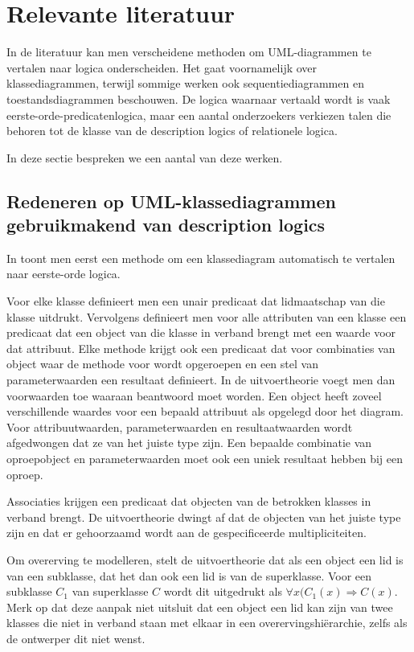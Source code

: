 \chapter{Relevante literatuur}\label{sec:literatuur}
In de literatuur kan men verscheidene methoden om UML-diagrammen te vertalen naar logica onderscheiden. Het gaat voornamelijk over klassediagrammen, terwijl sommige werken ook sequentiediagrammen en toestandsdiagrammen beschouwen. De logica waarnaar vertaald wordt is vaak eerste-orde-predicatenlogica, maar een aantal onderzoekers verkiezen talen die behoren tot de klasse van de description logics of relationele logica.

In deze sectie bespreken we een aantal van deze werken.

\section{Redeneren op UML-klassediagrammen gebruikmakend van description logics}
In \cite{BerardiDaniela2005RoUc} toont men eerst een methode om een klassediagram automatisch te vertalen naar eerste-orde logica.

Voor elke klasse definieert men een unair predicaat dat lidmaatschap van die klasse uitdrukt. Vervolgens definieert men voor alle attributen van een klasse een predicaat dat een object van die klasse in verband brengt met een waarde voor dat attribuut. Elke methode krijgt ook een predicaat dat voor combinaties van object waar de methode voor wordt opgeroepen en een stel van parameterwaarden een resultaat definieert. In de uitvoertheorie voegt men dan voorwaarden toe waaraan beantwoord moet worden. Een object heeft zoveel verschillende waardes voor een bepaald attribuut als opgelegd door het diagram. Voor attribuutwaarden, parameterwaarden en resultaatwaarden wordt afgedwongen dat ze van het juiste type zijn. Een bepaalde combinatie van oproepobject en parameterwaarden moet ook een uniek resultaat hebben bij een oproep.

Associaties krijgen een predicaat dat objecten van de betrokken klasses in verband brengt. De uitvoertheorie dwingt af dat de objecten van het juiste type zijn en dat er gehoorzaamd wordt aan de gespecificeerde multipliciteiten.

Om overerving te modelleren, stelt de uitvoertheorie dat als een object een lid is van een subklasse, dat het dan ook een lid is van de superklasse. Voor een subklasse $C_1$ van superklasse $C$ wordt dit uitgedrukt als $\forall{x}(C_1(x) \Rightarrow C(x)$. Merk op dat deze aanpak niet uitsluit dat een object een lid kan zijn van twee klasses die niet in verband staan met elkaar in een overervingshi\"erarchie, zelfs als de ontwerper dit niet wenst.

